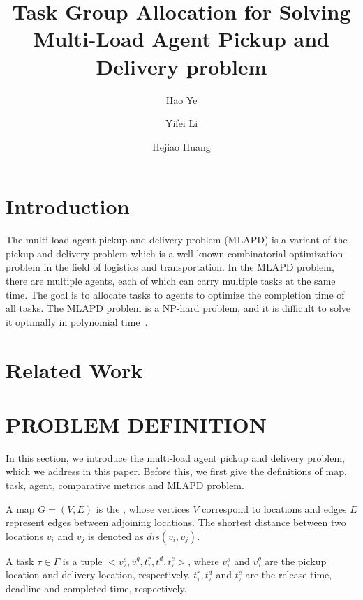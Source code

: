 \documentclass[sigconf,anonymous]{aamas}
\title[AAMAS-2025 Formatting Instructions]{Task Group Allocation for Solving Multi-Load Agent Pickup and Delivery problem}
\author{Hao Ye}
\affiliation{
  \institution{Harbin Institute of Technology (Shenzhen)}
  \city{Shenzhen}
  \country{China}}
\author{Yifei Li}
\affiliation{
  \institution{Harbin Institute of Technology (Shenzhen)}
  \city{Shenzhen}
  \country{China}}
\author{Hejiao Huang}
\affiliation{
  \institution{Harbin Institute of Technology (Shenzhen)}
  \city{Shenzhen}
  \country{China}}
\begin{document}

\pagestyle{fancy}
\fancyhead{}


\maketitle 

\section{Introduction}
The multi-load agent pickup and delivery problem (MLAPD) is a variant of the pickup and delivery problem
which is a well-known combinatorial optimization problem in the field of logistics and transportation.
In the MLAPD problem, there are multiple agents, each of which can carry multiple tasks at the same time.
The goal is to allocate tasks to agents to optimize the completion time of all tasks.
The MLAPD problem is a NP-hard problem, and it is difficult to solve it optimally in polynomial time~\cite{bai2022group}.

\section{Related Work}
\section{PROBLEM DEFINITION}
In this section, we introduce the multi-load agent pickup and delivery problem, 
which we address in this paper. 
Before this, we first give the definitions of map, task, agent, comparative metrics and MLAPD problem.

\begin{definition}[Map]
\label{MapDfn}
    A map $G = (V, E)$ is the , 
    whose vertices $V$ correspond to locations and edges $E$ represent edges between adjoining locations.
    The shortest distance between two locations $v_{i}$ and $v_{j}$ is denoted as $dis(v_{i}, v_{j})$.

\end{definition}

\begin{definition}[Task]
\label{TaskDfn}
    A task $\tau \in \Gamma$ is a tuple 
    $<v^{s}_{\tau}, v^{g}_{\tau}, t^{r}_{\tau}, t^{d}_{\tau}, t^{c}_{\tau}>$, 
    where $v^{s}_{\tau}$ and $v^{g}_{\tau}$ are the pickup location and delivery location, respectively. 
    $t^{r}_{\tau}, t^{d}_{\tau}$ and $t^{c}_{\tau}$ are the release time, deadline and completed time, respectively.
\end{definition}
\end{document}

